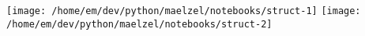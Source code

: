 \texttt{[image: /home/em/dev/python/maelzel/notebooks/struct-1]}%
\ifx\betweenLilyPondSystem \undefined
  \linebreak
\else
  \expandafter{}%
\fi
\texttt{[image: /home/em/dev/python/maelzel/notebooks/struct-2]}%
